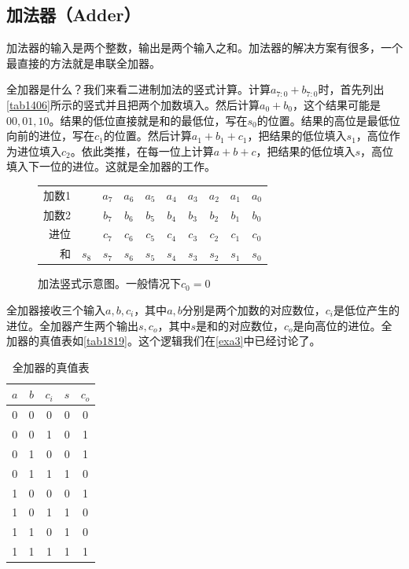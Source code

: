 \subsection{加法器（Adder）}
加法器的输入是两个整数，输出是两个输入之和。加法器的解决方案有很多，一个最直接的方法就是串联全加器。

全加器是什么？我们来看二进制加法的竖式计算。计算$a_{7:0}+b_{7:0}$时，首先列出\autoref{tab1406}所示的竖式并且把两个加数填入。然后计算$a_0+b_0$，这个结果可能是$00,01,10$。结果的低位直接就是和的最低位，写在$s_0$的位置。结果的高位是最低位向前的进位，写在$c_1$的位置。然后计算$a_1+b_1+c_1$，把结果的低位填入$s_1$，高位作为进位填入$c_2$。依此类推，在每一位上计算$a+b+c$，把结果的低位填入$s$，高位填入下一位的进位。这就是全加器的工作。

\begin{figure}[!ht]
\centering
\begin{tabular}{rccccccccc}
加数1&&$a_7$&$a_6$&$a_5$&$a_4$&$a_3$&$a_2$&$a_1$&$a_0$\\
加数2&&$b_7$&$b_6$&$b_5$&$b_4$&$b_3$&$b_2$&$b_1$&$b_0$\\
进位&&$c_7$&$c_6$&$c_5$&$c_4$&$c_3$&$c_2$&$c_1$&$c_0$\\\hline
和&$s_8$&$s_7$&$s_6$&$s_5$&$s_4$&$s_3$&$s_2$&$s_1$&$s_0$
\end{tabular}
\caption{加法竖式示意图。一般情况下$c_0=0$}\label{tab1406}
\end{figure}

全加器接收三个输入$a,b,c_i$，其中$a,b$分别是两个加数的对应数位，$c_i$是低位产生的进位。全加器产生两个输出$s,c_o$，其中$s$是和的对应数位，$c_o$是向高位的进位。全加器的真值表如\autoref{tab1819}。这个逻辑我们在\autoref{exa3}中已经讨论了。

\begin{table}[!ht]
\centering
\begin{tabular}{ccc|cc}
$a$&$b$&$c_i$&$s$&$c_o$\\\hline
0&0&0&0&0\\
0&0&1&0&1\\
0&1&0&0&1\\
0&1&1&1&0\\
1&0&0&0&1\\
1&0&1&1&0\\
1&1&0&1&0\\
1&1&1&1&1
\end{tabular}
\caption{全加器的真值表}\label{tab1819}
\end{table}

